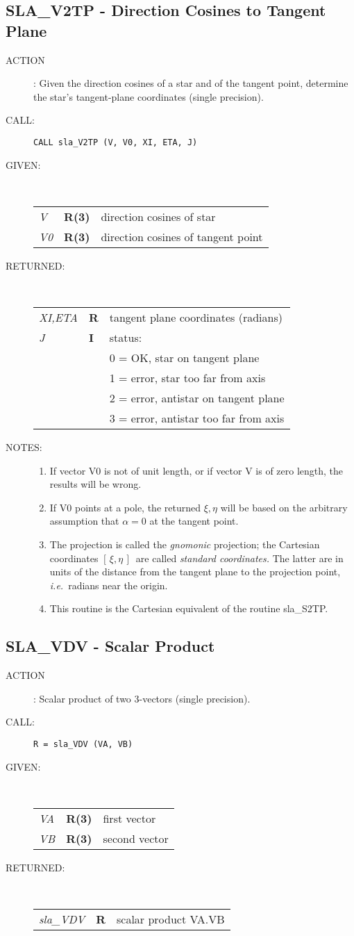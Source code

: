 \documentclass[11pt,twoside]{article}
\newcommand{\xlabel}[1]{}
\newcommand{\xieta}     {$[\,\xi,\eta\,]$}
\newcommand{\routine}[3]
{\hbadness=10000
  \vbox
  {
    \rule{\textwidth}{0.3mm}\\
    {\Large {\bf #1} \hfill #2 \hfill {\bf #1}}\\
    \setlength{\oldspacing}{\topsep}
    \setlength{\topsep}{0.3ex}
    \begin{description}
      #3
    \end{description}
    \setlength{\topsep}{\oldspacing}
  }
}
\renewcommand{\routine}[3]
   {
      \subsection{#1\xlabel{#1} - #2\label{#1}}
       \begin{description}
         #3
       \end{description}
   }
\newcommand{\action}[1]
{\item[ACTION]: #1}
\newcommand{\action}[1]
   {\item[ACTION:] #1}
\newcommand{\call}[1]
{\item[CALL]: \hspace{0.4em}{\tt #1}}
\newlength{\oldspacing}
\renewcommand{\call}[1]
   {
    \item[CALL:] {\tt #1}
   }
\newcommand{\args}[2]
{
  \goodbreak
  \setlength{\oldspacing}{\topsep}
  \setlength{\topsep}{0.3ex}
  \begin{description}
  \item[#1]:\\[1.5ex]
    \begin{tabular}{p{7em}p{6em}p{22em}}
      #2
    \end{tabular}
  \end{description}
  \setlength{\topsep}{\oldspacing}
}
\renewcommand{\args}[2]
   {
     \begin{description}
        \item[#1:]\\
        \begin{tabular}{p{7em}p{6em}l}
           #2
        \end{tabular}
     \end{description}
   }
\newcommand{\spec}[3]
{
  {\em {#1}} & {\bf \mbox{#2}} & {#3}
}
\newcommand{\notes}[1]
{
  \goodbreak
  \setlength{\oldspacing}{\topsep}
  \setlength{\topsep}{0.3ex}
  \begin{description}
    \item[NOTES]:
        #1
  \end{description}
  \setlength{\topsep}{\oldspacing}
}
\renewcommand{\notes}[1]
   {
      \begin{description}
         \item[NOTES:]
            #1
      \end{description}
   }
\begin{document}
\routine{SLA\_V2TP}{Direction Cosines to Tangent Plane}
{
 \action{Given the direction cosines of a star and of the tangent point,
         determine the star's tangent-plane coordinates
         (single precision).}
 \call{CALL sla\_V2TP (V, V0, XI, ETA, J)}
}
\args{GIVEN}
{
 \spec{V}{R(3)}{direction cosines of star} \\
 \spec{V0}{R(3)}{direction cosines of tangent point}
}
\args{RETURNED}
{
 \spec{XI,ETA}{R}{tangent plane coordinates (radians)} \\
 \spec{J}{I}{status:} \\
 \spec{}{}{\hspace{1.5em} 0 = OK, star on tangent plane} \\
 \spec{}{}{\hspace{1.5em} 1 = error, star too far from axis} \\
 \spec{}{}{\hspace{1.5em} 2 = error, antistar on tangent plane} \\
 \spec{}{}{\hspace{1.5em} 3 = error, antistar too far from axis}
}
\notes
{
 \begin{enumerate}
  \item If vector V0 is not of unit length, or if vector V is of zero
        length, the results will be wrong.
  \item If V0 points at a pole, the returned $\xi,\eta$
        will be based on the
        arbitrary assumption that $\alpha=0$ at the tangent point.
  \item The projection is called the {\it gnomonic}\/ projection;  the
        Cartesian coordinates \xieta\ are called 
        {\it standard coordinates.}\/  The latter
        are in units of the distance from the tangent plane to the projection
        point, {\it i.e.}\ radians near the origin.
  \item This routine is the Cartesian equivalent of the routine sla\_S2TP.
 \end{enumerate}
}
\routine{SLA\_VDV}{Scalar Product}
{
 \action{Scalar product of two 3-vectors (single precision).}
 \call{R~=~sla\_VDV (VA, VB)}
}
\args{GIVEN}
{
 \spec{VA}{R(3)}{first vector} \\
 \spec{VB}{R(3)}{second vector}
}
\args{RETURNED}
{
 \spec{sla\_VDV}{R}{scalar product VA.VB}
}
\end{document}
